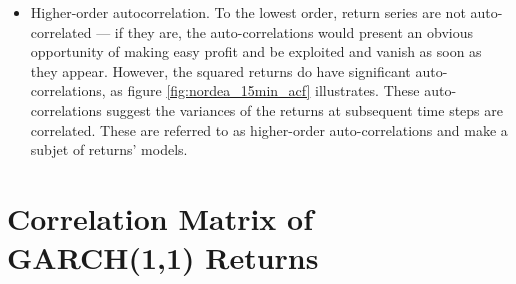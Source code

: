 \documentclass{report}
\begin{document}
\begin{itemize}
\item Higher-order autocorrelation. To the lowest order, return series
  are not auto-correlated --- if they are, the auto-correlations would
  present an obvious opportunity of making easy profit and be
  exploited and vanish as soon as they appear. However, the squared
  returns do have significant auto-correlations, as figure
  \ref{fig:nordea_15min_acf} illustrates. These auto-correlations
  suggest the variances of the returns at subsequent time steps are
  correlated. These are referred to as higher-order auto-correlations
  and make a subjet of returns' models.
  
\end{itemize}




\chapter{Correlation Matrix of GARCH(1,1) Returns}
\label{chp:CrossCorrelationFat}

\end{document}
